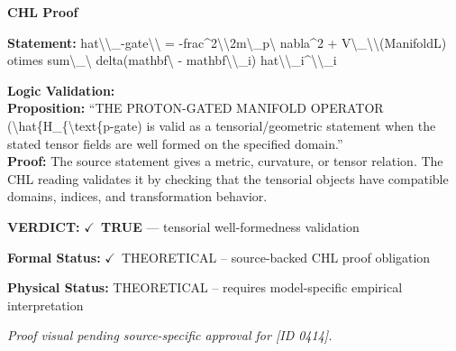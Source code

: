 \vspace{0.45em}
\noindent\textbf{CHL Proof}\par
\textbf{Statement:} hat\textbackslash{}\textbackslash{}\_-gate\textbackslash{}\textbackslash{} = -frac\textasciicircum{}2\textbackslash{}\textbackslash{}2m\textbackslash{}\_p\textbackslash{} nabla\textasciicircum{}2 + V\textbackslash{}\_\textbackslash{}\textbackslash{}(ManifoldL) otimes sum\textbackslash{}\_\textbackslash{} delta(mathbf\textbackslash{} -
mathbf\textbackslash{}\textbackslash{}\_i) hat\textbackslash{}\textbackslash{}\_i\textasciicircum{}\textbackslash{}\textbackslash{}\_i

\textbf{Logic Validation:}\\
\textbf{Proposition:} ``THE PROTON-GATED MANIFOLD OPERATOR (\textbackslash{}hat\{H\_\{\textbackslash{}text\{p-gate) is valid as a
tensorial/geometric statement when the stated tensor fields are well formed on the
specified domain.''\\
\textbf{Proof:} The source statement gives a metric, curvature, or tensor relation. The CHL reading
validates it by checking that the tensorial objects have compatible domains, indices,
and transformation behavior.

\textbf{VERDICT:} \ensuremath{\checkmark}\ \textbf{TRUE} --- tensorial well-formedness validation

\textbf{Formal Status:} \ensuremath{\checkmark}\ THEORETICAL -- source-backed CHL proof obligation

\textbf{Physical Status:} THEORETICAL -- requires model-specific empirical interpretation
\par\vspace{0.45em}
\par
\vfill
\begingroup\footnotesize\itshape
Proof visual pending source-specific approval for [ID 0414].
\par\endgroup
\vfill
\endgroup
\endgroup
